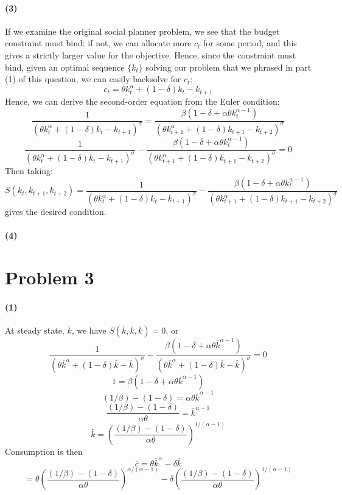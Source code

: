\documentclass[10pt,letter]{article}
\newcommand{\problem}[1]{\section*{Problem #1}}
\newcommand{\problempart}[1]{\paragraph{#1}}
\begin{document}
\problempart{(3)} If we examine the original social planner problem, we see that the budget constraint must bind: if not, we can allocate more $c_t$ for some period, and this gives a strictly larger value for the objective. Hence, since the constraint must bind, given an optimal sequence $\{ k_t \}$ solving our problem that we phrased in part (1) of this question, we can easily backsolve for $c_t$:
\[ c_t = \theta k_t^\alpha + (1-\delta)k_t - k_{t+1} \]
Hence, we can derive the second-order equation from the Euler condition:
\[ \frac{1}{(\theta k_t^\alpha + (1-\delta)k_t - k_{t+1})^\sigma} = \frac{\beta(1-\delta + \alpha \theta k_t^{\alpha - 1})}{(\theta k_{t+1}^\alpha + (1-\delta)k_{t+1} - k_{t+2})^\sigma} \]
\[ \frac{1}{(\theta k_t^\alpha + (1-\delta)k_t - k_{t+1})^\sigma} - \frac{\beta(1-\delta + \alpha \theta k_t^{\alpha - 1})}{(\theta k_{t+1}^\alpha + (1-\delta)k_{t+1} - k_{t+2})^\sigma} = 0 \]
Then taking:
\[ S(k_t, k_{t+1}, k_{t+2} ) = \frac{1}{(\theta k_t^\alpha + (1-\delta)k_t - k_{t+1})^\sigma} - \frac{\beta(1-\delta + \alpha \theta k_t^{\alpha - 1})}{(\theta k_{t+1}^\alpha + (1-\delta)k_{t+1} - k_{t+2})^\sigma} \]
gives the desired condition.

\problempart{(4)}
\problem{3}
\problempart{(1)}
At steady state, $\bar{k}$, we have
$S(\bar{k}, \bar{k}, \bar{k}) = 0$, or
\[\frac{1}{(\theta \bar{k}^\alpha + (1-\delta)\bar{k} - \bar{k})^\sigma} - \frac{\beta(1-\delta + \alpha \theta \bar{k}^{\alpha - 1})}{(\theta \bar{k}^\alpha + (1-\delta)\bar{k} - \bar{k})^\sigma} = 0 \]
\[1 = \beta(1-\delta + \alpha \theta \bar{k}^{\alpha - 1}) \]
\[ (1/\beta) - (1-\delta) = \alpha \theta \bar{k}^{\alpha - 1} \]
\[ \frac{(1/\beta) - (1-\delta)}{\alpha \theta} = \bar{k}^{\alpha - 1} \]
\[ \bar{k} = \left(\frac{(1/\beta) - (1-\delta)}{\alpha \theta} \right)^{1/(\alpha - 1)} \]
Consumption is then
\[ \bar{c} = \theta \bar{k}^\alpha - \delta \bar{k}   \]
\[ = \theta \left(\frac{(1/\beta) - (1-\delta)}{\alpha \theta} \right)^{\alpha/(\alpha - 1)} - \delta \left(\frac{(1/\beta) - (1-\delta)}{\alpha \theta} \right)^{1/(\alpha - 1)} \]
\end{document}
